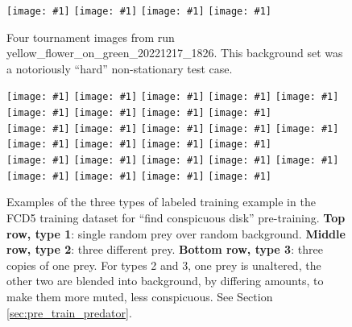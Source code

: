 \documentclass[acmtog,
    anonymous,
    review
    ]{acmart}
\newcommand{\runID}{\footnotesize}
\newcommand{\igfour}[1]{\texttt{[image: \#1]}}
\newcommand{\ignine}[1]{\texttt{[image: \#1]}}
\begin{document}
\begin{figure}
    \igfour{20221218_step_5396.png}
    \hfill
    \igfour{20221218_step_5641.png}
    \hfill
    \igfour{20221218_step_5947.png}
    \hfill
    \igfour{20221218_step_6753.png}
    \caption{Four tournament images from run {\runID yellow\_flower\_on\_green\_20221217\_1826}. This background set was a notoriously “hard” non-stationary test case.}
    \label{fig:yellow_flower_4x}
\end{figure}

\begin{figure}
    \vspace{0.5cm}
    \ignine{20220303_UVSfqCzewt_38_20.png}
    \hfill
    \ignine{20220303_SBWaLRHOzk_56_33.png}
    \hfill
    \ignine{20220303_bUMqcbutgJ_25_78.png}
    \hfill
    \ignine{20220303_HZzUzWWqcC_54_28.png}
    \hfill
    \ignine{20220303_inuPKUxnHQ_72_71.png}
    \hfill
    \ignine{20220303_RRGCwhmcJc_101_84.png}
    \hfill
    \ignine{20220303_PYinyJAWaj_61_60.png}
    \hfill
    \ignine{20220303_TNXfhQtzYa_92_91.png}
    \hfill
    \ignine{20220303_cDMtFaTYKk_63_54.png}
    \\
    \vspace{0.1cm}
    \ignine{20220303_wIRPERwSCh_49_63.png}
    \hfill
    \ignine{20220303_edDsCjbHdf_61_92.png}
    \hfill
    \ignine{20220303_fGMFBgMQDX_93_86.png}
    \hfill
    \ignine{20220303_jQREPLQyuL_33_39.png}
    \hfill
    \ignine{20220303_ijBOHTccYX_104_101.png}
    \hfill
    \ignine{20220303_KAoOFAqFyU_80_58.png}
    \hfill
    \ignine{20220303_NExMwxEbzU_85_92.png}
    \hfill
    \ignine{20220303_kpcUyhHXOh_91_98.png}
    \hfill
    \ignine{20220303_oWPwPGkcSb_82_22.png}
    \\
    \vspace{0.1cm}
    \ignine{20220303_uAEPxMZbeo_83_45.png}
    \hfill
    \ignine{20220303_cADfBauZUV_47_32.png}
    \hfill
    \ignine{20220303_YAMfudJxeH_30_84.png}
    \hfill
    \ignine{20220303_JeyBgDfMcN_40_82.png}
    \hfill
    \ignine{20220303_OaOJaByhbU_90_55.png}
    \hfill
    \ignine{20220303_mhYpDjxaKf_78_57.png}
    \hfill
    \ignine{20220303_ASsEgFUlly_23_60.png}
    \hfill
    \ignine{20220303_nzgItDrYqT_71_99.png}
    \hfill
    \ignine{20220303_QuHYtnPora_72_73.png}
    \caption{Examples of the three types of labeled training example in the FCD5 training dataset for “find conspicuous disk” pre-training. \textbf{Top row, type 1}: single random prey over random background. \textbf{Middle row, type 2}: three different prey. \textbf{Bottom row, type 3}: three copies of one prey. For types 2 and 3, one prey is unaltered, the other two are blended into background, by differing amounts, to make them more muted, less conspicuous. See Section \ref{sec:pre_train_predator}.}
    \label{fig:fcd5_examples}
\end{figure}
\end{document}
